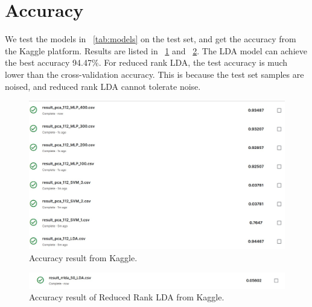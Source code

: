 \section{Accuracy}
\label{sec:accuracy}

We test the models in \tablename{}~\ref{tab:models} on the test set, and get the accuracy from the Kaggle platform.
Results are listed in \figurename{}~\ref{fig:result-kaggle} and \figurename{}~\ref{fig:result-rrlda}.
The LDA model can achieve the best accuracy 94.47\%.
For reduced rank LDA, the test accuracy is much lower than the cross-validation accuracy.
This is because the test set samples are noised, and reduced rank LDA cannot tolerate noise.

\begin{figure}
    \centering
    \includegraphics[width=\linewidth]{figures/kaggle.jpg}
    \caption{Accuracy result from Kaggle.}
    \label{fig:result-kaggle}
\end{figure}


\begin{figure}
    \centering
    \includegraphics[width=\linewidth]{figures/rr-lda.jpg}
    \caption{Accuracy result of Reduced Rank LDA from Kaggle.}
    \label{fig:result-rrlda}
\end{figure}